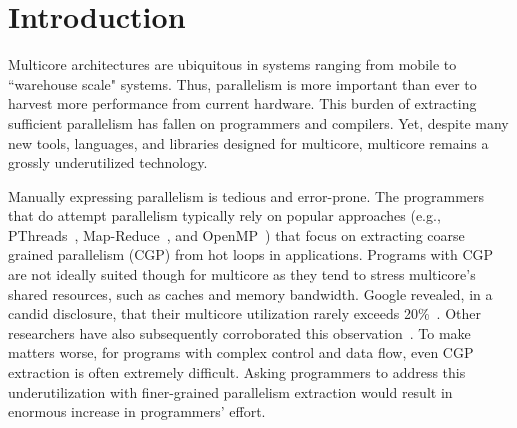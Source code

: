 \section{Introduction}




Multicore architectures are ubiquitous in systems ranging from mobile to
``warehouse scale" systems. Thus, parallelism is more important than ever to
harvest more performance from current hardware.  This burden of extracting
sufficient parallelism has fallen on programmers and compilers. Yet, despite
many new tools, languages, and libraries designed for multicore, multicore
remains a grossly underutilized technology.



Manually expressing parallelism is tedious and error-prone. The programmers that
do attempt parallelism typically rely on popular approaches (e.g.,
PThreads~\cite{pthread:web}, Map-Reduce~\cite{dean:08:cacm}, and
OpenMP~\cite{openmp:web}) that focus on extracting coarse grained parallelism
(CGP) from hot loops in applications.
%
Programs with CGP are not ideally suited though for multicore as they tend to
stress multicore's shared resources, such as caches and memory bandwidth.
Google revealed, in a candid disclosure, that their multicore utilization rarely
exceeds 20\%~\cite{barroso:07:computer}. Other researchers have also
subsequently corroborated this observation~\cite{chung:13:isca}.
%
To make matters worse, for programs with complex control and data flow, even CGP
extraction is often extremely difficult.
%
Asking programmers to address this underutilization with finer-grained
parallelism extraction would result in enormous increase in programmers' effort.
%

